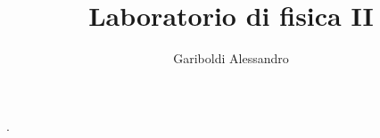 \documentclass[a4paper, oneside]{article}
\title{Laboratorio di fisica II}
\author{Gariboldi Alessandro}
\date{ }
\begin{document}
                {}          %
                {}          %
                {\slshape}  %
                {}          %
                {\bfseries} %
                {.}         %
                {\newline}         %
                {}          %
\theoremstyle{theoremEnv}

\newtheorem{definition}{Definizione}[section]
\newtheorem{theorem}{Teorema}[section]
\newtheorem{lemma}{Lemma}[section]
\newtheorem{observation}{Oss.}[section]
\newtheorem{corollary}{Corollario}[theorem]
\newtheorem{example}{Esempio}[section]
\newtheorem{problem}{Problema}[section]
\newtheorem{solution}{Soluzione}[section]
\newtheorem{proposition}{Proposizione}[section]
\newtheorem{aside}{Inciso}[section]


\maketitle
\end{document}
